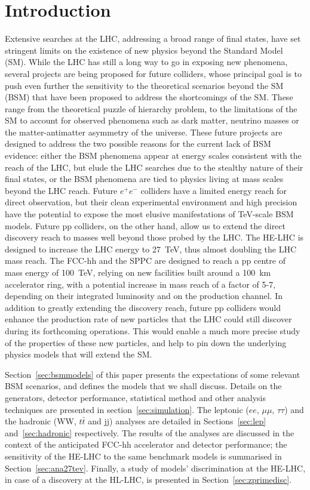 \section{Introduction}
\label{sec:intro}
Extensive searches at the LHC, addressing a broad range of final states, have set stringent limits on the existence of new physics beyond the Standard Model (SM). While the LHC has still a long way to go in exposing new phenomena, several projects are being proposed for future colliders, whose principal goal is to push even further the sensitivity to the theoretical scenarios beyond the SM (BSM) that have been proposed to address the shortcomings of the SM. These range from the theoretical puzzle of hierarchy problem, to the limitations of the SM to account for observed phenomena such as dark matter, neutrino masses or the matter-antimatter asymmetry of the universe. These future projects are designed to address the two possible reasons for the current lack of BSM evidence: either the BSM phenomena appear at energy scales consistent with the reach of the LHC, but elude the LHC searches due to the stealthy nature of their final states, or the BSM phenomena are tied to physics living at mass scales beyond the LHC reach. Future $e^+e^-$ colliders have a limited energy reach for direct observation, but their clean experimental environment and high precision have the potential to expose the most elusive manifestations of TeV-scale BSM models. Future pp colliders, on the other hand, allow us to extend the direct discovery reach to masses well beyond those probed by the LHC. The HE-LHC is designed to increase the LHC energy to 27~TeV, thus almost doubling the LHC mass reach. The FCC-hh and the SPPC are designed to reach a pp centre of mass energy of 100~TeV, relying on new facilities built around a 100~km accelerator ring, with a potential increase in mass reach of a factor of 5-7, depending on their integrated luminosity and on the production channel. In addition to greatly extending the discovery reach, future pp colliders would enhance the production rate of new particles that the LHC could still discover during its forthcoming operations. This would enable a much more precise study of the properties of these new particles, and help to pin down the underlying physics models that will extend the SM. 


Section~\ref{sec:bsmmodels} of this paper presents the expectations of some relevant BSM scenarios, and defines the models that we shall discuss.  Details on the generators, detector performance, statistical method and other analysis techniques are presented in section~\ref{sec:simulation}. The leptonic ($ee$, $\mu\mu$, $\tau\tau$) and the hadronic (WW, $t\bar{t}$ and jj) analyses are detailed in Sections~\ref{sec:lep} and~\ref{sec:hadronic} respectively. The results of the analyses are discussed in the context of the anticipated FCC-hh accelerator and detector performance; the sensitivity of the HE-LHC to the same benchmark models is summarised in Section~\ref{sec:ana27tev}. Finally, a study of \Zp models' discrimination at the HE-LHC, in case of a discovery at the HL-LHC, is presented in Section~\ref{sec:zprimedisc}.

